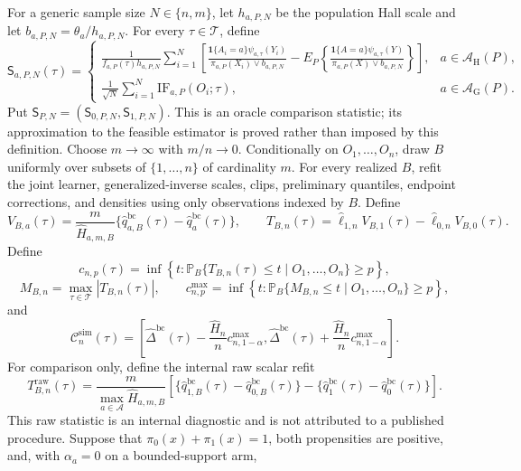 For a generic sample size \(N\in\{n,m\}\), let \(h_{a,P,N}\) be the population Hall scale and let \(b_{a,P,N}=\theta_a/h_{a,P,N}\).  For every \(\tau\in\mathcal T\), define
\[
 \mathsf S_{a,P,N}(\tau)=
 \begin{cases}
 \displaystyle
 \frac1{f_{a,P}(\tau)h_{a,P,N}}
 \sum_{i=1}^N\left[
 \frac{\mathbf1\{A_i=a\}\psi_{a,\tau}(Y_i)}
      {\pi_{a,P}(X_i)\vee b_{a,P,N}}
 -E_P\!\left\{
 \frac{\mathbf1\{A=a\}\psi_{a,\tau}(Y)}
      {\pi_{a,P}(X)\vee b_{a,P,N}}
 \right\}\right],&a\in\mathcal A_{\mathrm H}(P),\\
 \displaystyle
 \frac1{\sqrt N}\sum_{i=1}^N\mathrm{IF}_{a,P}(O_i;\tau),&a\in\mathcal A_{\mathrm G}(P).
 \end{cases}
\]
Put \(\mathsf S_{P,N}=(\mathsf S_{0,P,N},\mathsf S_{1,P,N})\).  This is an oracle comparison statistic; its approximation to the feasible estimator is proved rather than imposed by this definition.
Choose \(m\to\infty\) with \(m/n\to0\).  Conditionally on \(O_1,\ldots,O_n\), draw \(B\) uniformly over subsets of \(\{1,\ldots,n\}\) of cardinality \(m\).  For every realized \(B\), refit the joint learner, generalized-inverse scales, clips, preliminary quantiles, endpoint corrections, and densities using only observations indexed by \(B\).  Define
\[
 V_{B,a}(\tau)=\frac m{\widehat H_{a,m,B}}
 \{\widehat q_{a,B}^{\mathrm{bc}}(\tau)-\widehat q_a^{\mathrm{bc}}(\tau)\},
 \qquad
 T_{B,n}(\tau)=\widehat\ell_{1,n}V_{B,1}(\tau)-\widehat\ell_{0,n}V_{B,0}(\tau).
\]
Define
\[
 c_{n,p}(\tau)=\inf\left\{t:\mathbb P_B\{T_{B,n}(\tau)\le t\mid O_1,\ldots,O_n\}\ge p\right\},
\]
\[
 M_{B,n}=\max_{\tau\in\mathcal T}|T_{B,n}(\tau)|,
 \qquad
 c^{\max}_{n,p}=\inf\left\{t:\mathbb P_B\{M_{B,n}\le t\mid O_1,\ldots,O_n\}\ge p\right\},
\]
and
\[
 \mathcal C_n^{\mathrm{sim}}(\tau)=
 \left[\widehat\Delta^{\mathrm{bc}}(\tau)-\frac{\widehat H_n}{n}c^{\max}_{n,1-\alpha},
 \widehat\Delta^{\mathrm{bc}}(\tau)+\frac{\widehat H_n}{n}c^{\max}_{n,1-\alpha}\right].
\]
For comparison only, define the internal raw scalar refit
\[
 T^{\mathrm{raw}}_{B,n}(\tau)
 =\frac m{\max_{a\in\mathcal A}\widehat H_{a,m,B}}
 \left[
 \{\widehat q_{1,B}^{\mathrm{bc}}(\tau)-\widehat q_{0,B}^{\mathrm{bc}}(\tau)\}
 -\{\widehat q_1^{\mathrm{bc}}(\tau)-\widehat q_0^{\mathrm{bc}}(\tau)\}
 \right].
\]
This raw statistic is an internal diagnostic and is not attributed to a published procedure.
Suppose that \(\pi_0(x)+\pi_1(x)=1\), both propensities are positive, and, with \(\alpha_a=0\) on a bounded-support arm,
